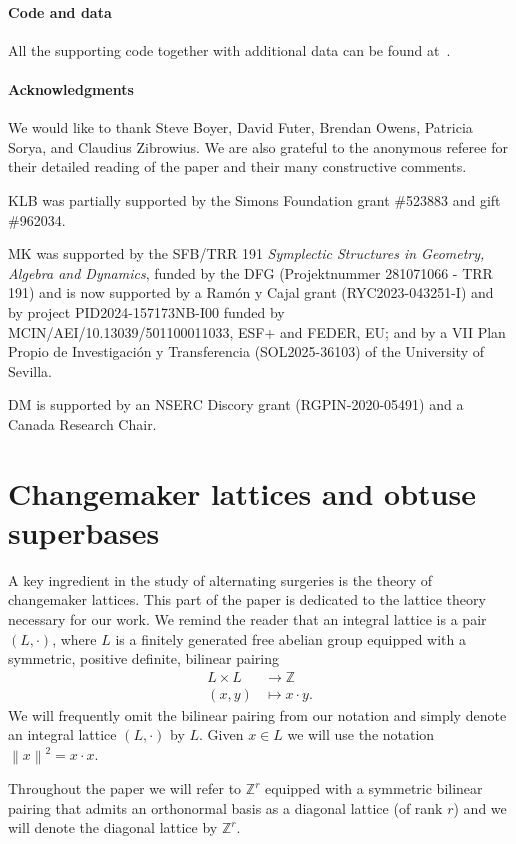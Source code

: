 \documentclass{amsart} %
\newcommand{\Z}{\mathbb{Z}}
\newcommand{\norm}[1]{\left\lVert #1 \right\rVert^2}
\theoremstyle{thm}
\theoremstyle{definition}
\numberwithin{equation}{section}
\begin{document}
\subsection*{Code and data}
All the supporting code together with additional data can be found at~\cite{BKM}.

\subsection*{Acknowledgments}
We would like to thank Steve Boyer, David Futer, Brendan Owens, Patricia Sorya, and Claudius Zibrowius. We are also grateful to the anonymous referee for their detailed reading of the paper and their many constructive comments.

KLB was partially supported by the Simons Foundation grant \#523883 and gift \#962034.

MK was supported by the SFB/TRR 191 \textit{Symplectic Structures in Geometry, Algebra and Dynamics}, funded by the DFG (Projektnummer 281071066 - TRR 191) and is now supported by a Ram\'on y Cajal grant (RYC2023-043251-I) and by project PID2024-157173NB-I00 funded by MCIN/AEI/10.13039/501100011033, ESF+ and FEDER, EU; and by a VII Plan Propio de Investigación y Transferencia (SOL2025-36103) of the University of Sevilla.

DM is supported by an NSERC Discory grant (RGPIN-2020-05491) and a Canada Research Chair.

\part{Changemaker lattices and obtuse superbases}\label{part:lattices}
A key ingredient in the study of alternating surgeries is the theory of changemaker lattices. This part of the paper is dedicated to the lattice theory necessary for our work. We remind the reader that an integral lattice is a pair $(L,\cdot)$, where $L$ is a finitely generated free abelian group equipped with a symmetric, positive definite, bilinear pairing
\begin{align*}
    L\times L &\rightarrow \Z\\
    (x,y)&\mapsto x\cdot y.
\end{align*}
We will frequently omit the bilinear pairing from our notation and simply denote an integral lattice $(L,\cdot)$ by $L$. Given $x\in L$ we will use the notation $\norm{x}=x\cdot x$.

Throughout the paper we will refer to $\Z^r$ equipped with a symmetric bilinear pairing that admits an orthonormal basis as a diagonal lattice (of rank $r$) and we will denote the diagonal lattice by $\Z^r$. 
\end{document}

